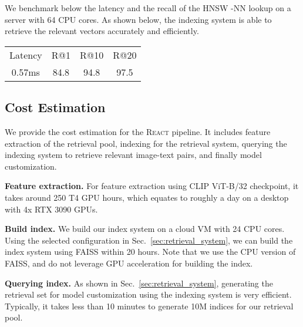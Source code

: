 \documentclass[10pt,twocolumn,letterpaper]{article}
\renewcommand{\paragraph}[1]{\vspace{1.25mm}\noindent\textbf{#1}}
\newcommand{\shortname}{\textsc{React}}
\begin{document}
We benchmark below the latency and the recall of the HNSW -NN lookup on a server with 64 CPU cores.  As shown below, the indexing system is able to retrieve the relevant vectors accurately and efficiently.

\begin{table}[h]
    \centering
    \footnotesize
    \vspace{-3mm}
    \begin{tabular}{cccc}
        Latency & R@1 & R@10 & R@20 \\
        \shline
        0.57ms & 84.8 & 94.8 & 97.5 \\
    \end{tabular}
\end{table}

\subsection{Cost Estimation}

\label{sec:details_cost}

We provide the cost estimation for the \shortname{} pipeline.  It includes feature extraction of the retrieval pool, indexing for the retrieval system, querying the indexing system to retrieve relevant image-text pairs, and finally model customization.

\paragraph{Feature extraction.}  For feature extraction using CLIP ViT-B/32 checkpoint, it takes around 250 T4 GPU hours, which equates to roughly a day on a desktop with 4x RTX 3090 GPUs.

\paragraph{Build index.}  We build our index system on a cloud VM with 24 CPU cores.  Using the selected configuration in Sec.~\ref{sec:retrieval_system}, we can build the index system using FAISS within 20 hours.  Note that we use the CPU version of FAISS, and do not leverage GPU acceleration for building the index.

\paragraph{Querying index.} As shown in Sec.~\ref{sec:retrieval_system}, generating the retrieval set for model customization using the indexing system is very efficient.  Typically, it takes less than 10 minutes to generate 10M indices for our retrieval pool.
\end{document}
